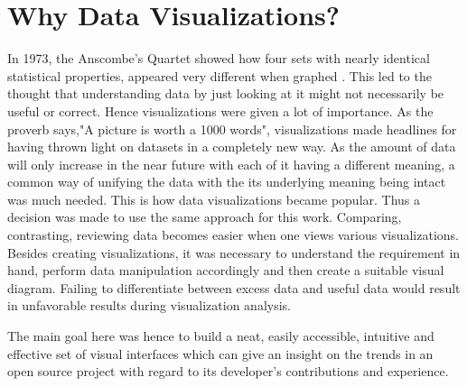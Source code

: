 \documentclass[seploa]{beavtex}
\begin{document}
\section{Why Data Visualizations?}
In 1973, the Anscombe's Quartet showed how four sets with nearly identical statistical properties, appeared very different when graphed \cite{wiki}. This led to the thought that understanding data by just looking at it might not necessarily be useful or correct. Hence visualizations were given a lot of importance. As the proverb says,"A picture is worth a 1000 words", visualizations made headlines for having thrown light on datasets in a completely new way. As the amount of data will only increase in the near future with each of it having a different meaning, a common way of unifying the data with the its underlying meaning being intact was much needed. This is how data visualizations became popular. Thus a decision was made to use the same approach for this work. Comparing, contrasting, reviewing data becomes easier when one views various visualizations. Besides creating visualizations, it was necessary to understand the requirement in hand, perform data manipulation accordingly and then create a suitable visual diagram. Failing to differentiate between excess data and useful data would result in unfavorable results during visualization analysis.

The main goal here was hence to build a neat, easily accessible, intuitive and effective set of visual interfaces which can give an insight on the trends in an open source project with regard to its developer's contributions and experience.
\end{document}
